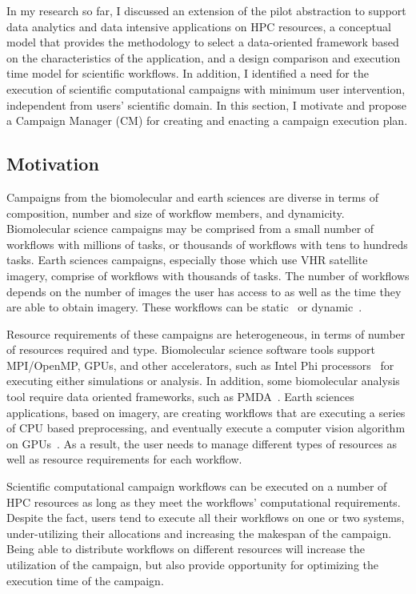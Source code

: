 \label{research}
In my research so far, I discussed an extension of the pilot abstraction to support data analytics and data intensive applications on HPC resources, a conceptual model that provides the methodology to select a data-oriented framework based on the characteristics of the application, and a design comparison and execution time model for scientific workflows.
In addition, I identified a need for the execution of scientific computational campaigns with minimum user intervention, independent from users' scientific domain.
In this section, I motivate and propose a Campaign Manager (CM) for creating and enacting a campaign execution plan.

\subsection{Motivation}
Campaigns from the biomolecular and earth sciences are diverse in terms of composition, number and size of workflow members, and dynamicity.
Biomolecular science campaigns may be comprised from a small number of workflows with millions of tasks, or thousands of workflows with tens to hundreds tasks. 
Earth sciences campaigns, especially those which use VHR satellite imagery, comprise of workflows with thousands of tasks.
The number of workflows depends on the number of images the user has access to as well as the time they are able to obtain imagery.
These workflows can be static~\cite{paraskevakos2019workflow} or dynamic~\cite{dakka2018high}.

Resource requirements of these campaigns are heterogeneous, in terms of number of resources required and type. 
Biomolecular science software tools support MPI/OpenMP, GPUs, and other accelerators, such as Intel Phi processors~\cite{cheatham2015impact} for executing either simulations or analysis. In addition, some biomolecular analysis tool require data oriented frameworks, such as PMDA~\cite{fan2019pmda}.
Earth sciences applications, based on imagery, are creating workflows that are executing a series of CPU based preprocessing, and eventually execute a computer vision algorithm on GPUs~\cite{paraskevakos2019workflow}.
As a result, the user needs to manage different types of resources as well as resource requirements for each workflow.

Scientific computational campaign workflows can be executed on a number of HPC resources as long as they meet the workflows' computational requirements.
Despite the fact, users tend to execute all their workflows on one or two systems, under-utilizing their allocations and increasing the makespan of the campaign.
Being able to distribute workflows on different resources will increase the utilization of the campaign, but also provide opportunity for optimizing the execution time of the campaign.

